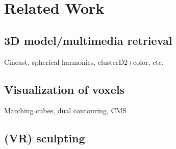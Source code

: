 \chapter{Related Work}

\section{3D model/multimedia retrieval}
Cineast, spherical harmonics, clusterD2+color, etc.

\section{Visualization of voxels}
Marching cubes, dual contouring, CMS

\section{(VR) sculpting}